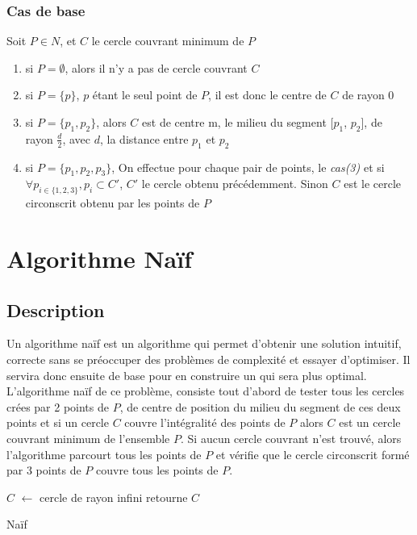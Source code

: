 \documentclass[12pt, a4paper, titlepage]{article}
\begin{document}
        \subsubsection{Cas de base}\label{eq:bases}
        Soit $P \in N$, et $C$ le cercle couvrant minimum de $P$
        \begin{enumerate}
            \item si $P = \emptyset$, alors il n'y a pas de cercle couvrant $C$
            \item si $P = \{p\}$, $p$ étant le seul point de $P$, il est donc le centre de $C$ de rayon $0$
            \item si $P = \{p_{1}, p_{2}\}$, alors $C$ est de centre m, le milieu du segment [$p_{1}$, $p_{2}$], de rayon $\frac{d}{2}$, avec $d$, la distance entre $p_{1}$ et $p_{2}$
            \item si $P = \{p_{1}, p_{2}, p_{3}\}$, On effectue pour chaque pair de points, le \textit{cas(3)} et si $\forall p_{i \in \{1,2,3\}},$\space$p_{i} \subset C'$, $C'$ le cercle obtenu précédemment. Sinon $C$ est le cercle circonscrit obtenu par les points de $P$ 
        \end{enumerate}


\section{Algorithme Naïf}
    \subsection{Description}
    Un algorithme naïf est un algorithme qui permet d'obtenir une solution intuitif, correcte sans se préoccuper des problèmes de complexité et essayer d'optimiser. Il servira donc ensuite de base pour en construire un qui sera plus optimal.\\
     L'algorithme naïf de ce problème, consiste tout d'abord de tester tous les cercles crées par 2 points de $P$, de centre de position du milieu du segment de ces deux points et si un cercle $C$ couvre l'intégralité des points de $P$ alors $C$ est un cercle couvrant minimum de l'ensemble $P$. Si aucun cercle couvrant n'est trouvé, alors l'algorithme parcourt tous les points de $P$ et vérifie que le cercle circonscrit formé par 3 points de $P$ couvre tous les points de $P$.\\

    \begin{algorithm}[H]
    \SetAlgoLined
    \BlankLine
    $C$ $\leftarrow$ cercle de rayon infini\;
    retourne $C$\;
     \caption{Naïf}
    \end{algorithm}
\end{document}
